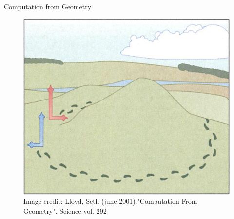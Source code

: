 \documentclass[t]{beamer}
\begin{document}
\begin{frame}{}
\tableofcontents[ 
currentsubsection, 
hideothersubsections, 
sectionstyle=show/shaded, 
subsectionstyle=show/shaded, 
] 
\end{frame}

\begin{frame}{Computation from Geometry}
\begin{figure}
\begin{center}
\includegraphics[scale=0.25]{geom.png}
\captionsetup{labelformat=empty}
\caption{{\tiny Image credit: Lloyd, Seth (june 2001)."Computation From Geometry". Science vol. 292}}
\end{center}
\end{figure}
\end{frame}

%
%
%
\end{document}
